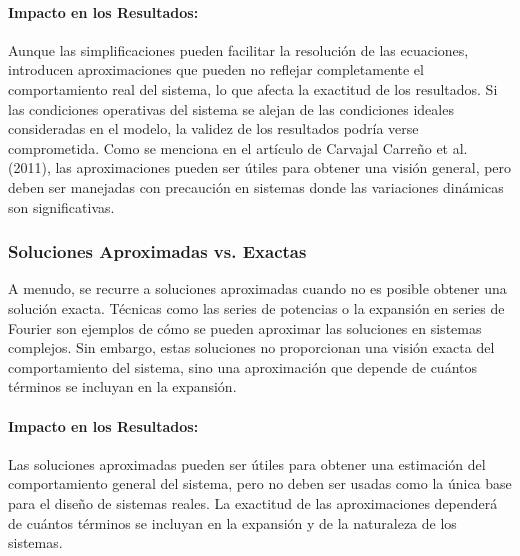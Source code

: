 \paragraph*{Impacto en los Resultados:}
Aunque las simplificaciones pueden facilitar la resolución de las ecuaciones,
introducen aproximaciones que pueden no reflejar completamente el comportamiento
real del sistema, lo que afecta la exactitud de los resultados. Si las condiciones
operativas del sistema se alejan de las condiciones ideales consideradas en el modelo,
la validez de los resultados podría verse comprometida. Como se menciona en el
artículo de Carvajal Carreño et al. (2011), las aproximaciones pueden ser útiles para
obtener una visión general, pero deben ser manejadas con precaución en sistemas
donde las variaciones dinámicas son significativas.

\subsubsection*{Soluciones Aproximadas vs. Exactas}
A menudo, se recurre a soluciones aproximadas cuando no es posible obtener una solución
exacta. Técnicas como las series de potencias o la expansión en series de Fourier son
ejemplos de cómo se pueden aproximar las soluciones en sistemas complejos. Sin embargo,
estas soluciones no proporcionan una visión exacta del comportamiento del sistema, sino una
aproximación que depende de cuántos términos se incluyan en la expansión.

\paragraph*{Impacto en los Resultados:}
Las soluciones aproximadas pueden ser útiles para obtener una estimación del
comportamiento general del sistema, pero no deben ser usadas como la única base
para el diseño de sistemas reales. La exactitud de las aproximaciones dependerá de
cuántos términos se incluyan en la expansión y de la naturaleza de los sistemas.
